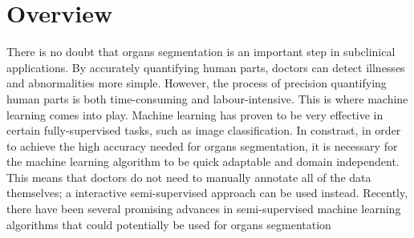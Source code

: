 \section{Overview}
\label{sec:overview}
There is no doubt that organs segmentation is an important step in subclinical applications. By accurately quantifying human parts, doctors can detect illnesses and abnormalities more simple. However, the process of precision quantifying human parts is both time-consuming and labour-intensive. This is where machine learning comes into play. Machine learning has proven to be very effective in certain fully-supervised tasks, such as image classification. In constrast, in order to achieve the high accuracy needed for organs segmentation, it is necessary for the machine learning algorithm to be quick adaptable and domain independent. This means that doctors do not need to manually annotate all of the data themselves; a interactive semi-supervised approach can be used instead. Recently, there have been several promising advances in semi-supervised machine learning algorithms that could potentially be used for organs segmentation
